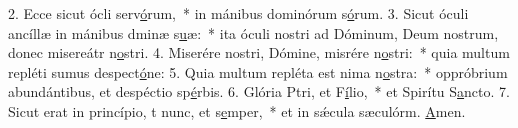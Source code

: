2. Ecce sicut ócli serv\uline{ó}rum,~* in mánibus dominórum s\uline{ó}rum.
3. Sicut óculi ancíllæ in mánibus dminæ s\uline{u}æ:~* ita óculi nostri ad Dóminum, Deum nostrum, donec misereátr n\uline{o}stri.
4. Miserére nostri, Dómine, misrére n\uline{o}stri:~* quia multum repléti sumus despect\uline{ó}ne:
5. Quia multum repléta est nima n\uline{o}stra:~* oppróbrium abundántibus, et despéctio sp\uline{é}rbis.
6. Glória Ptri, et F\uline{í}lio,~* et Spirítu S\uline{a}ncto.
7. Sicut erat in princípio, t nunc, et s\uline{e}mper,~* et in sǽcula sæculórm. \uline{A}men.
